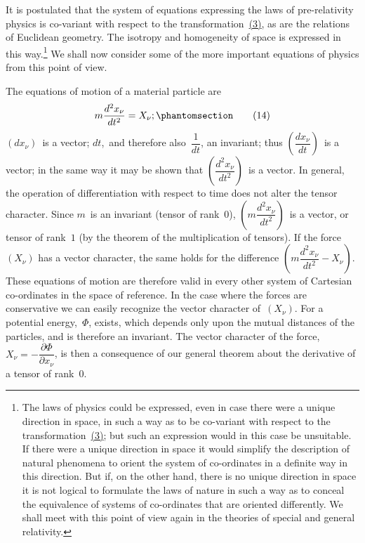 \documentclass[12pt]{book}[2005/09/16]
\newcommand{\Change}[2]{#2}
\newcommand{\Add}[1]{\Change{}{#1}}
\newcommand{\PageSep}[1]{\ignorespaces}
\newcommand{\Tag}[1]{%
  \phantomsection
  \label{eqn:#1}
  \tag*{#1}
}
\newcommand{\Eqref}[1]{\hyperref[eqn:#1]{#1}}
\newcommand{\dd}{\partial}
\begin{document}
It is postulated that the system of equations expressing
the laws of pre-relativity physics is co-variant with respect
to the transformation~\Eqref{(3)}, as are the relations of Euclidean
geometry. The isotropy and homogeneity of space is
%
%
%
%
expressed in this way.\footnote
  {The laws of physics could be expressed, even in case there were a
  unique direction in space, in such a way as to be co-variant with respect to
  the transformation~\Eqref{(3)}; but such an expression would in this case be unsuitable.
  If there were a unique direction in space it would simplify the
  description of natural phenomena to orient the system of co-ordinates in a
  definite way in this direction. But if, on the other hand, there is no unique
  direction in space it is not logical to formulate the laws of nature in such
  a way as to conceal the equivalence of systems of co-ordinates that are
  oriented differently. We shall meet with this point of view again in the
  theories of special and general relativity.}
We shall now consider some of
\PageSep{18}
the more important equations of physics from this point
of view.

The equations of motion of a material particle are
\[
m \frac{d^{2} x_{\nu}}{dt^{2}} = X_{\nu}\Add{;}
\Tag{(14)}
\]
$(dx_{\nu})$~is a vector; $dt$,~and therefore also~$\dfrac{1}{dt}$, an invariant;
thus $\left(\dfrac{dx_{\nu}}{dt}\right)$~is a vector; in the same way it may be shown
that $\left(\dfrac{d^{2} x_{\nu}}{dt^{2}}\right)$~is a vector. In general, the operation of differentiation
with respect to time does not alter the tensor
character. Since $m$~is an invariant (tensor of rank~$0$),
$\left(m\dfrac{d^{2} x_{\nu}}{dt^{2}}\right)$~is a vector, or tensor of rank~$1$ (by the theorem
of the multiplication of tensors). If the force~$(X_{\nu})$ has
a vector character, the same holds for the difference
$\left(m\dfrac{d^{2} x_{\nu}}{dt^{2}} - X_{\nu}\right)$. These equations of motion are therefore
valid in every other system of Cartesian co-ordinates in
the space of reference. In the case where the forces are
conservative we can easily recognize the vector character
of~$(X_{\nu})$. For a potential energy,~$\Phi$, exists, which depends
only upon the mutual distances of the particles, and is
therefore an invariant. The vector character of the force,
$X_{\nu} = -\dfrac{\dd \Phi}{\dd x_{\nu}}$, is then a consequence of our general theorem
about the derivative of a tensor of rank~$0$.
\PageSep{19}
\end{document}
